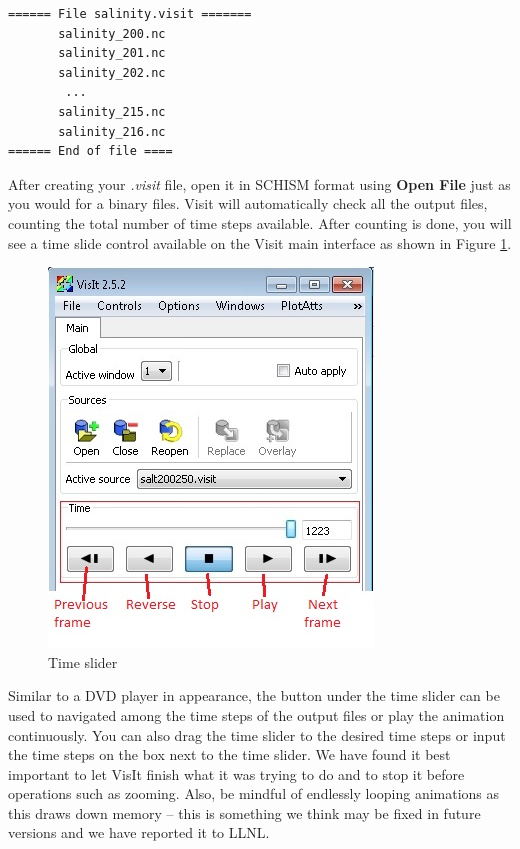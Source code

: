 \documentclass[12pt]{report}
\begin{document}
\begin{verbatim}
====== File salinity.visit =======
       salinity_200.nc
       salinity_201.nc
       salinity_202.nc
        ... 
       salinity_215.nc
       salinity_216.nc
====== End of file ====
\end{verbatim}
		
	
After creating your \emph{.visit} file, open it in SCHISM format using {\bf Open \textrightarrow File} 
just as you would for a binary files. Visit will automatically check all the output files, 
counting the total number of time steps available. After counting is done, you will 
see a time slide control available on the Visit main interface as shown in Figure \ref{figure:timeVCR}.
			
			  \begin{figure}
        \begin{center}
        \includegraphics{timeVCR}
        \caption{Time slider}
        \label{figure:timeVCR}
        \end{center}
        \end{figure} 
				
Similar to a DVD player in appearance, the button under the time slider can be used to navigated among the time steps of the output files or play the animation continuously.  You can also drag the time slider to the 
desired time steps or input the time steps on the box next to the time slider. We have found it
best important to let VisIt finish what it was trying to do and to stop it before operations such as zooming.
Also, be mindful of endlessly looping animations as this draws down memory -- this is something we think
may be fixed in future versions and we have reported it to LLNL.
			
\end{document}
